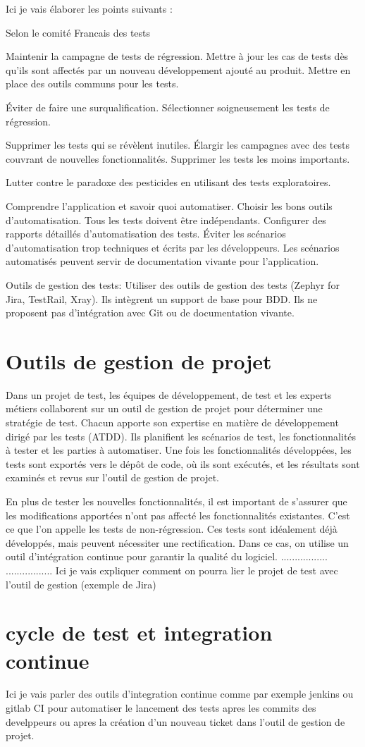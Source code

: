 Ici je vais élaborer les points suivants \parencite{cftl} :

Selon le comité Francais des tests 

Maintenir la campagne de tests de régression.
Mettre à jour les cas de tests dès qu'ils sont affectés par un nouveau développement ajouté au produit.
Mettre en place des outils communs pour les tests.

Éviter de faire une surqualification.
Sélectionner soigneusement les tests de régression.


Supprimer les tests qui se révèlent inutiles.
Élargir les campagnes avec des tests couvrant de nouvelles fonctionnalités.
Supprimer les tests les moins importants.


Lutter contre le paradoxe des pesticides en utilisant des tests exploratoires.

Comprendre l'application et savoir quoi automatiser.
Choisir les bons outils d'automatisation.
Tous les tests doivent être indépendants.
Configurer des rapports détaillés d'automatisation des tests.
Éviter les scénarios d'automatisation trop techniques et écrits par les développeurs.
Les scénarios automatisés peuvent servir de documentation vivante pour l'application.

Outils de gestion des tests:
Utiliser des outils de gestion des tests (Zephyr for Jira, TestRail, Xray).
Ils intègrent un support de base pour BDD.
Ils ne proposent pas d'intégration avec Git ou de documentation vivante.


\section{Outils de gestion de projet}
\label{sec:outils}
Dans un projet de test, les équipes de développement, de test et les experts métiers collaborent sur un outil de gestion de projet pour déterminer une stratégie de test. Chacun apporte son expertise en matière de développement dirigé par les tests (ATDD). Ils planifient les scénarios de test, les fonctionnalités à tester et les parties à automatiser. Une fois les fonctionnalités développées, les tests sont exportés vers le dépôt de code, où ils sont exécutés, et les résultats sont examinés et revus sur l'outil de gestion de projet.

En plus de tester les nouvelles fonctionnalités, il est important de s'assurer que les modifications apportées n'ont pas affecté les fonctionnalités existantes. C'est ce que l'on appelle les tests de non-régression. Ces tests sont idéalement déjà développés, mais peuvent nécessiter une rectification. Dans ce cas, on utilise un outil d'intégration continue pour garantir la qualité du logiciel.
.................
................. Ici je vais expliquer comment on pourra lier le projet de test avec l'outil de gestion (exemple de Jira)

\section{cycle de test et integration continue}

Ici je vais parler des outils d'integration continue comme par exemple jenkins ou gitlab CI pour automatiser le lancement des tests apres les commits des develppeurs ou apres la création d'un nouveau ticket dans l'outil de gestion de projet.
